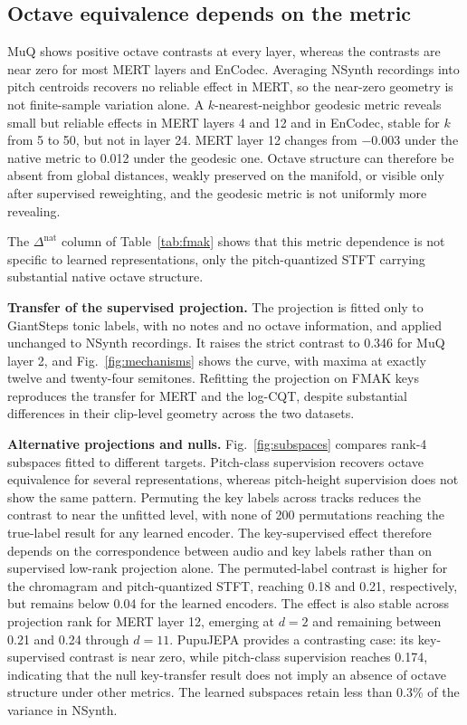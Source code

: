 \documentclass{article}
\begin{document}
\subsection{Octave equivalence depends on the metric}
\label{pg:s43}
\label{sec:metric}

MuQ shows positive octave contrasts at every layer, whereas the contrasts are near zero for most MERT layers and EnCodec. Averaging NSynth recordings into pitch centroids recovers no reliable effect in MERT, so the near-zero geometry is not finite-sample variation alone. A $k$-nearest-neighbor geodesic metric reveals small but reliable effects in
MERT layers 4 and 12 and in EnCodec, stable for $k$ from 5 to 50, but not in
layer 24. MERT layer 12 changes from $-0.003$ under the native metric to 0.012 under the
geodesic one. Octave structure can therefore be absent from global distances, weakly
preserved on the manifold, or visible only after supervised reweighting, and
the geodesic metric is not uniformly more revealing.

The $\Delta^{\mathrm{nat}}$ column of Table~\ref{tab:fmak} shows that this
metric dependence is not specific to learned representations, only the
pitch-quantized STFT carrying substantial native octave structure.

\noindent\textbf{Transfer of the supervised projection.} The projection is
fitted only to GiantSteps tonic labels, with no notes and no octave
information, and applied unchanged to NSynth recordings. It raises the strict
contrast to 0.346 for MuQ layer 2, and Fig.~\ref{fig:mechanisms} shows the curve, with maxima at exactly twelve and twenty-four semitones. Refitting the projection on FMAK keys reproduces the transfer for MERT and the log-CQT, despite substantial differences in their clip-level geometry across the two datasets.

\noindent\textbf{Alternative projections and nulls.}
Fig.~\ref{fig:subspaces} compares rank-4 subspaces fitted to different targets. Pitch-class supervision recovers octave equivalence for several representations, whereas pitch-height supervision does not show the same pattern. Permuting the key labels across tracks reduces the contrast to near the unfitted level, with none of 200 permutations reaching the true-label result for any learned encoder. The key-supervised effect therefore depends on the correspondence between audio and key labels rather than on supervised low-rank projection alone. The permuted-label contrast is higher for the chromagram and pitch-quantized STFT, reaching 0.18 and 0.21, respectively, but remains below 0.04 for the learned encoders. The effect is also stable across projection rank for MERT layer 12, emerging at $d=2$ and remaining between 0.21 and 0.24 through $d=11$. PupuJEPA provides a contrasting case: its key-supervised contrast is near zero, while pitch-class supervision reaches 0.174, indicating that the null key-transfer result does not imply an absence of octave structure under other metrics. The learned subspaces retain less than 0.3\% of the variance in NSynth.
\end{document}
